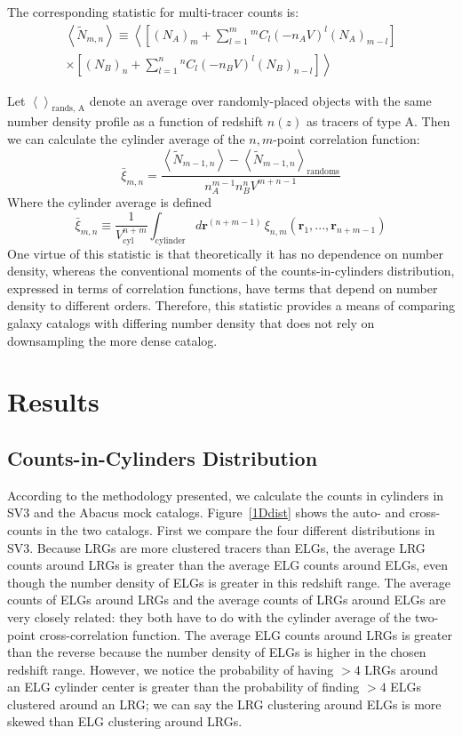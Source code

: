 \documentclass[fleqn,usenatbib]{mnras}
\newcommand*{\Comb}[2]{{}^{#1}C_{#2}}%
\begin{document}
The corresponding statistic for multi-tracer counts is:
\begin{multline}
\left<\tilde{N}_{m,n}\right> \equiv \left<\left[(N_A)_m+\sum_{l=1}^m \Comb{m}{l}(-n_AV)^l(N_A)_{m-l}\right] \right.\\
\times \left.\left[(N_B)_n+\sum_{l=1}^n \Comb{n}{l}(-n_BV)^l(N_B)_{n-l}\right]\right>
\end{multline}

Let $\left<\right>_{\text{rands, A}}$ denote an average over randomly-placed objects with the same number density profile as a function of redshift $n(z)$ as tracers of type A. Then we can calculate the cylinder average of the $n,m$-point correlation function:
\begin{equation}
\bar{\xi}_{m,n} = \frac{\left<\tilde{N}_{m-1,n}\right> - \left<\tilde{N}_{m-1,n}\right>_{\text{randoms}}}{n_A^{m-1}n_B^nV^{m+n-1}}
\end{equation}
Where the cylinder average is defined
\begin{equation}
\bar{\xi}_{m,n} \equiv \frac{1}{V_{\text{cyl}}^{n+m}}\int_{\text{cylinder}} d\mathbf{r}^{(n+m-1)}\,\xi_{n,m}(\mathbf{r}_1,...,\mathbf{r}_{n+m-1})
\end{equation}
One virtue of this statistic is that theoretically it has no dependence on number density, whereas the conventional moments of the counts-in-cylinders distribution, expressed in terms of correlation functions, have terms that depend on number density to different orders. Therefore, this statistic provides a means of comparing galaxy catalogs with differing number density that does not rely on downsampling the more dense catalog.

\section*{Results}
\subsection*{Counts-in-Cylinders Distribution}
According to the methodology presented, we calculate the counts in cylinders in SV3 and the Abacus mock catalogs. Figure~\ref{1Ddist} shows the auto- and cross-counts in the two catalogs. First we compare the four different distributions in SV3. Because LRGs are more clustered tracers than ELGs, the average LRG counts around LRGs is greater than the average ELG counts around ELGs, even though the number density of ELGs is greater in this redshift range. The average counts of ELGs around LRGs and the average counts of LRGs around ELGs are very closely related: they both have to do with the cylinder average of the two-point cross-correlation function. The average ELG counts around LRGs is greater than the reverse because the number density of ELGs is higher in the chosen redshift range. However, we notice the probability of having $>4$ LRGs around an ELG cylinder center is greater than the probability of finding $>4$ ELGs clustered around an LRG; we can say the LRG clustering around ELGs is more skewed than ELG clustering around LRGs.
\end{document}
